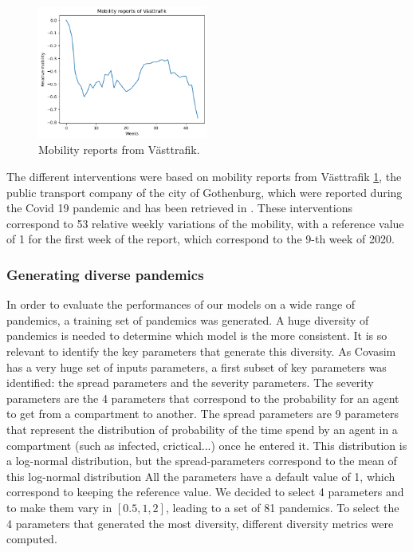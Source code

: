 \begin{figure}
    \centering
    \includegraphics[width=0.5\textwidth]{figures/mobility_reports.png}
    \caption{Mobility reports from Västtrafik.}
    \label{fig:mobility_reports}
\end{figure}


The different interventions were based on mobility reports from Västtrafik  \ref{fig:mobility_reports}, the public transport company of the city of Gothenburg, which were reported during the Covid 19 pandemic and has been retrieved in \cite{gerlee2021predicting}.
These interventions correspond to 53 relative weekly variations of the mobility, with a reference value of 1 for the first week of the report, which correspond to the 9-th week of 2020. 


\subsubsection{Generating diverse pandemics}

In order to evaluate the performances of our models on a wide range of pandemics, a training set of pandemics was generated. 
A huge diversity of pandemics is needed to determine which model is the more consistent.
It is so relevant to identify the key parameters that generate this diversity.
As Covasim has a very huge set of inputs parameters, a first subset of key parameters was identified: the spread parameters and the severity parameters. 
The severity parameters are the 4 parameters that correspond to the probability for an agent to get from a compartment to another. 
The spread parameters are 9 parameters that represent the distribution of probability of the time spend by an agent in a compartment (such as infected, crictical...) once he entered it. 
This distribution is a log-normal distribution, but the spread-parameters correspond to the mean of this log-normal distribution
All the parameters have a default value of 1, which correspond to keeping the reference value. 
We decided to select 4 parameters and to make them vary in $[0.5, 1, 2]$, leading to a set of 81 pandemics. 
To select the 4 parameters that generated the most diversity, different diversity metrics were computed. 

